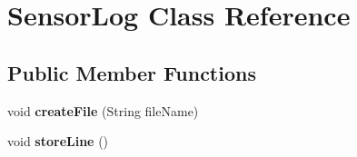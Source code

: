 \hypertarget{class_sensor_log}{}\section{Sensor\+Log Class Reference}
\label{class_sensor_log}
\subsection*{Public Member Functions}
\begin{DoxyCompactItemize}
\item 
void {\bfseries create\+File} (String file\+Name)\hypertarget{class_sensor_log_a2e3d6b7483e6f739cfecb89b04c5a034}{}\label{class_sensor_log_a2e3d6b7483e6f739cfecb89b04c5a034}

\item 
void {\bfseries store\+Line} ()\hypertarget{class_sensor_log_a099560f4b46211476b0d112e8322f890}{}\label{class_sensor_log_a099560f4b46211476b0d112e8322f890}

\end{DoxyCompactItemize}
